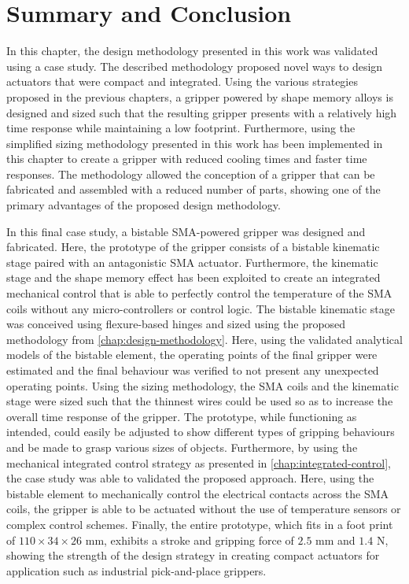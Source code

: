 \section{Summary and Conclusion}
In this chapter, the design methodology presented in this work was validated using a case study. The described methodology proposed novel ways to design actuators that were compact and integrated. Using the various strategies proposed in the previous chapters, a gripper powered by shape memory alloys is designed and sized such that the resulting gripper presents with a relatively high time response while maintaining a low footprint. Furthermore, using the simplified sizing methodology presented in this work has been implemented in this chapter to create a gripper with reduced cooling times and faster time responses. The methodology allowed the conception of a gripper that can be fabricated and assembled with a reduced number of parts, showing one of the primary advantages of the proposed design methodology.

In this final case study, a bistable SMA-powered gripper was designed and fabricated. Here, the prototype of the gripper consists of a bistable kinematic stage paired with an antagonistic SMA actuator. Furthermore, the kinematic stage and the shape memory effect has been exploited to create an integrated mechanical control that is able to perfectly control the temperature of the SMA coils without any micro-controllers or control logic. The bistable kinematic stage was conceived using flexure-based hinges and sized using the proposed methodology from \cref{chap:design-methodology}. Here, using the validated analytical models of the bistable element, the operating points of the final gripper were estimated and the final behaviour was verified to not present any unexpected operating points. Using the sizing methodology, the SMA coils and the kinematic stage were sized such that the thinnest wires could be used so as to increase the overall time response of the gripper. The prototype, while functioning as intended, could easily be adjusted to show different types of gripping behaviours and be made to grasp various sizes of objects. Furthermore, by using the mechanical integrated control strategy as presented in \cref{chap:integrated-control}, the case study was able to validated the proposed approach. Here, using the bistable element to mechanically control the electrical contacts across the SMA coils, the gripper is able to be actuated without the use of temperature sensors or complex control schemes. Finally, the entire prototype, which fits in a foot print of $110\times34\times26$ mm, exhibits a stroke and gripping force of $2.5$ mm and $1.4$ N, showing the strength of the design strategy in creating compact actuators for application such as industrial pick-and-place grippers.

